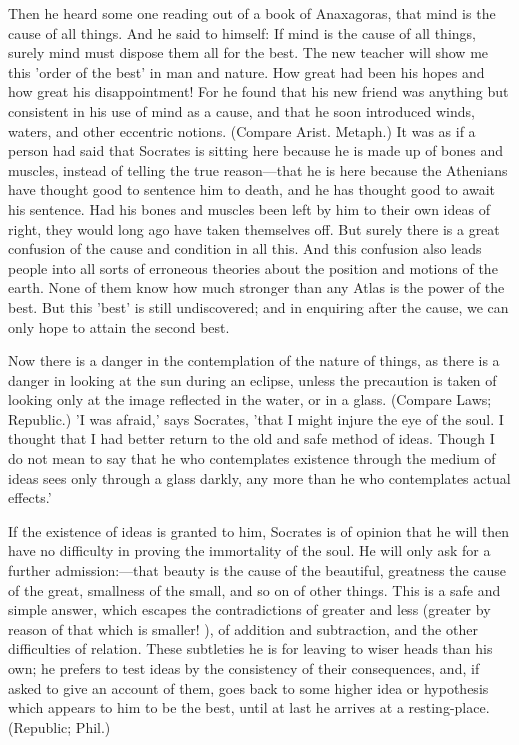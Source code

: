 \documentclass[11pt,letter]{article}
\begin{document}
\par  Then he heard some one reading out of a book of Anaxagoras, that mind is the cause of all things. And he said to himself: If mind is the cause of all things, surely mind must dispose them all for the best. The new teacher will show me this 'order of the best' in man and nature. How great had been his hopes and how great his disappointment! For he found that his new friend was anything but consistent in his use of mind as a cause, and that he soon introduced winds, waters, and other eccentric notions. (Compare Arist. Metaph.) It was as if a person had said that Socrates is sitting here because he is made up of bones and muscles, instead of telling the true reason—that he is here because the Athenians have thought good to sentence him to death, and he has thought good to await his sentence. Had his bones and muscles been left by him to their own ideas of right, they would long ago have taken themselves off. But surely there is a great confusion of the cause and condition in all this. And this confusion also leads people into all sorts of erroneous theories about the position and motions of the earth. None of them know how much stronger than any Atlas is the power of the best. But this 'best' is still undiscovered; and in enquiring after the cause, we can only hope to attain the second best.

\par  Now there is a danger in the contemplation of the nature of things, as there is a danger in looking at the sun during an eclipse, unless the precaution is taken of looking only at the image reflected in the water, or in a glass. (Compare Laws; Republic.) 'I was afraid,' says Socrates, 'that I might injure the eye of the soul. I thought that I had better return to the old and safe method of ideas. Though I do not mean to say that he who contemplates existence through the medium of ideas sees only through a glass darkly, any more than he who contemplates actual effects.'

\par  If the existence of ideas is granted to him, Socrates is of opinion that he will then have no difficulty in proving the immortality of the soul. He will only ask for a further admission:—that beauty is the cause of the beautiful, greatness the cause of the great, smallness of the small, and so on of other things. This is a safe and simple answer, which escapes the contradictions of greater and less (greater by reason of that which is smaller! ), of addition and subtraction, and the other difficulties of relation. These subtleties he is for leaving to wiser heads than his own; he prefers to test ideas by the consistency of their consequences, and, if asked to give an account of them, goes back to some higher idea or hypothesis which appears to him to be the best, until at last he arrives at a resting-place. (Republic; Phil.)
\end{document}
